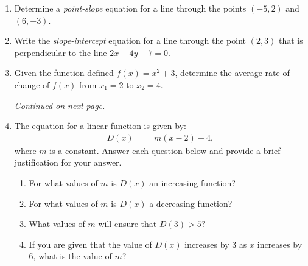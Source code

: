 

\begin{enumerate}
\item Determine a \emph{point-slope} equation for a line through the
  points $(-5,2)$ and $(6,-3)$.

  \vfill
  
\item Write the \emph{slope-intercept} equation for a line through the
  point $(2,3)$ that is perpendicular to the line $2x+4y-7=0$.

\vfill

\item Given the function defined $f(x)=x^2+3$, determine the average
  rate of change of $f(x)$ from $x_1=2$ to $x_2=4$.

  \vfill

  \textit{Continued on next page.}
  
  \clearpage

\item The equation for a linear function is given by:
  \begin{eqnarray*}
    D(x) & = & m(x-2)+4,
  \end{eqnarray*}
  where $m$ is a constant. Answer each question below and provide
  a brief justification for your answer.

  \begin{enumerate}
  \item For what values of $m$ is $D(x)$ an increasing function?
    \vfill
  \item For what values of $m$ is $D(x)$ a decreasing function?
    \vfill
  \item What values of $m$ will ensure that $D(3)>5$?
    \vfill
  \item If you are given that the value of $D(x)$ increases by 3 as
    $x$ increases by 6, what is the value of $m$? 
    \vfill
  \end{enumerate}


\end{enumerate}




